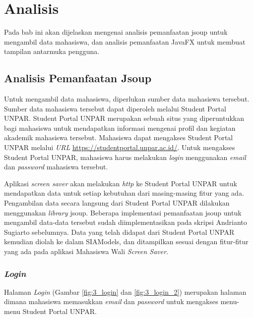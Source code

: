 \chapter{Analisis}
\label{chap:analisis}

Pada bab ini akan dijelaskan mengenai analisis pemanfaatan jsoup untuk mengambil data mahasiswa, dan analisis pemanfaatan JavaFX untuk membuat tampilan antarmuka pengguna.

\section{Analisis Pemanfaatan Jsoup}
Untuk mengambil data mahasiswa, diperlukan sumber data mahasiswa tersebut. Sumber data mahasiswa tersebut dapat diperoleh melalui Student Portal UNPAR. Student Portal UNPAR merupakan sebuah situs yang diperuntukkan bagi mahasiswa untuk mendapatkan informasi mengenai profil dan kegiatan akademik mahasiswa tersebut. Mahasiswa dapat mengakses Student Portal UNPAR melalui \textit{URL} \url{https://studentportal.unpar.ac.id/}. Untuk mengakses Student Portal UNPAR, mahasiswa harus melakukan \textit{login} menggunakan \textit{email} dan \textit{password} mahasiswa tersebut.

Aplikasi \textit{screen saver} akan melakukan \textit{http} ke Student Portal UNPAR untuk mendapatkan data untuk setiap kebutuhan dari masing-masing fitur yang ada. Pengambilan data secara langsung dari Student Portal UNPAR dilakukan menggunakan \textit{library} jsoup. Beberapa implementasi pemanfaatan jsoup untuk mengambil data-data tersebut sudah diimplementasikan pada skripsi Andrianto Sugiarto \cite{ifstupor} sebelumnya. Data yang telah didapat dari Student Portal UNPAR kemudian diolah ke dalam SIAModels, dan ditampilkan sesuai dengan fitur-fitur yang ada pada aplikasi Mahasiswa Wali \textit{Screen Saver}.

\subsection{\textit{Login}}
Halaman \textit{Login} (Gambar \ref{fig:3_login} dan \ref{fig:3_login_2}) merupakan halaman dimana mahasiswa memasukkan \textit{email} dan \textit{password} untuk mengakses menu-menu Student Portal UNPAR.

